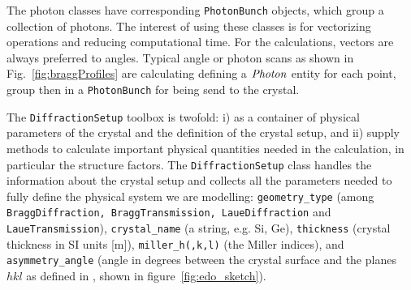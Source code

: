 \documentclass[preprint]{iucr}              %
\begin{document}
The photon classes 
have corresponding {\tt PhotonBunch} objects, which group a collection of photons. The interest of using these classes is for vectorizing operations and reducing computational time. For the calculations, vectors are always preferred to angles. Typical angle or photon scans as shown in Fig.~\ref{fig:braggProfiles} are calculating defining a $\tt Photon$ entity for each point, group then in a {\tt PhotonBunch} for being send to the crystal. 


The {\tt DiffractionSetup} toolbox is twofold: i) as a container of physical parameters of the crystal and the definition of the crystal setup, and ii) supply methods to calculate important physical quantities needed in the calculation, in particular the structure factors. The {\tt DiffractionSetup} class handles the information about the crystal setup and collects all the parameters needed to fully define the physical system we are modelling:
{\tt geometry\_type} (among {\tt BraggDiffraction, BraggTransmission, LaueDiffraction} and {\tt LaueTransmission}),
{\tt crystal\_name} (a string, e.g. Si, Ge),
{\tt thickness} (crystal thickness in SI units [m]),
{\tt miller\_h(,k,l)} (the Miller indices),
and {\tt asymmetry\_angle} (angle in degrees between the crystal surface and the planes $hkl$ as defined in \cite{codeCRYSTAL}, shown in figure~\ref{fig:edo_sketch}).


 
\end{document}
